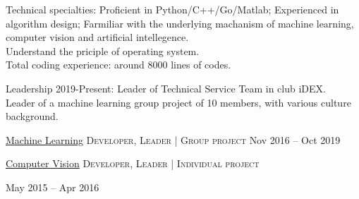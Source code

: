 \documentclass[10pt,a4paper]{article} %
\begin{document}


\spacedhrule{0.5em}{-0.4em} %



\inlineheadsection %
{Technical specialties:}
{
	Proficient in Python/C++/Go/Matlab; Experienced in algorithm design; Farmiliar with the underlying machanism of machine learning, computer vision and artificial intellegence.\\
	Understand the priciple of operating system.\\
	Total coding experience: around 8000 lines of codes.
} 
 

\inlineheadsection %
{Leadership 2019-Present:}
{Leader of Technical Service Team in club iDEX.\\
Leader of a machine learning group project of 10 members, with various culture background.}


\spacedhrule{1.6em}{-0.4em}

\headedsection
{\href{https://github.com/itzMeerkat/UCDavis-ECS171-2019Fall-Project}{Machine Learning}  }
{\textsc{Developer, Leader | Group project}} {
	\headedsubsection
	{}
	{Nov 2016 -- Oct 2019}
	{}
}

\headedsection
{\href{https://github.com/itzMeerkat/PrintableNote}{Computer Vision}}
{\textsc{Developer, Leader | Individual project}} {

	\headedsubsection
	{}
	{May 2015 -- Apr 2016}
	{}
}
\end{document}
